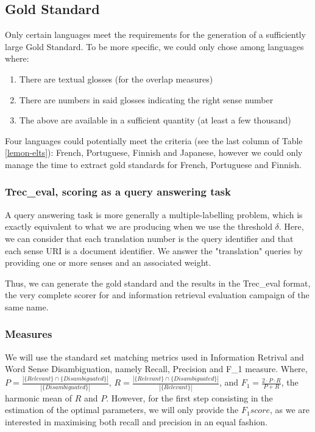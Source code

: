 \documentclass[10pt,a4paper,twoside]{article}
\begin{document}
\subsection{Gold Standard}
Only certain languages meet the requirements for the generation of a sufficiently large Gold Standard. To be more specific, we could only chose among languages where:
\begin{enumerate}
	\item There are textual glosses (for the overlap measures)
	\item There are numbers in said glosses indicating the right sense number
	\item The above are available in a sufficient quantity (at least a few thousand)
\end{enumerate}

Four languages could potentially meet the criteria (see the last column of Table \ref{lemon-elts}): French, Portuguese, Finnish and Japanese, however we could only manage the time to extract gold standards for French, Portuguese and Finnish.

\subsubsection{Trec\_eval, scoring as a query answering task}

A query answering task is more generally a multiple-labelling problem, which is exactly equivalent to what we are producing when we use the threshold \(\delta\). Here, we can consider that each translation number is the query identifier and that each sense URI is a document identifier. We answer the "translation" queries by providing one or more senses and an associated weight.

Thus, we can generate the gold standard and the results in the Trec\_eval format, the very complete scorer for and information retrieval evaluation campaign of the same name.

\subsubsection{Measures}
We will use the standard set matching metrics used in Information Retrival and Word Sense Disambiguation, namely Recall, Precision and F\_{1} measure. Where, \(P=\frac{|\{Relevant\}\cap\{Disambiguated\}|}{|\{Disambiguated\}|}\), \(R=\frac{|\{Relevant\}\cap\{Disambiguated\}|}{|\{Relevant\}|}\), and \(F_1 = \frac{2\cdot P \cdot R}{P + R} \), the harmonic mean of \(R\) and \(P\). However, for the first step consisting in the estimation of the optimal parameters, we will only provide the \(F_1 score\), as we are interested in maximising both recall and precision in an equal fashion.
\end{document}

